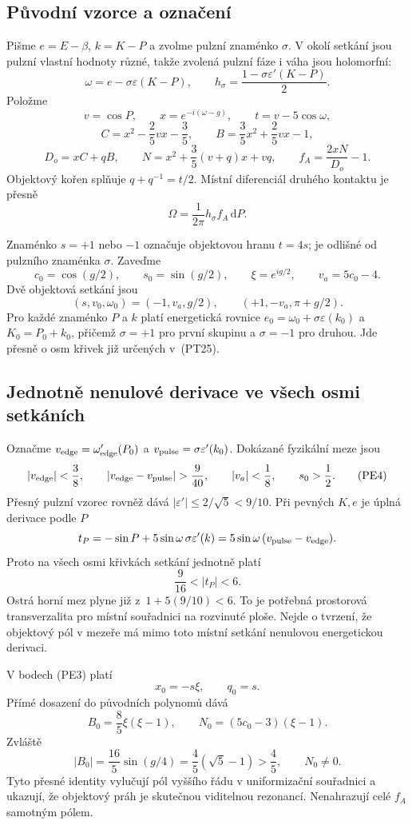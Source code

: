 \documentclass[11pt,a4paper]{article}
\theoremstyle{remark}\newtheorem{remark}[theorem]{Poznámka}
\numberwithin{equation}{section}
\begin{document}
\subsection{Původní vzorce a označení}

Pišme \(e=E-\beta\), \(k=K-P\) a zvolme pulzní znaménko
\(\sigma\). V okolí setkání jsou pulzní vlastní hodnoty různé,
takže zvolená pulzní fáze i váha jsou holomorfní:
\[
\omega=e-\sigma\varepsilon(K-P),\qquad
h_\sigma=\frac{1-\sigma\varepsilon'(K-P)}2.
\]
Položme
\[
v=\cos P,\qquad x=e^{-i(\omega-g)},\qquad t=v-5\cos\omega,
\]
\[
C=x^2-\frac25vx-\frac35,
\qquad B=\frac35x^2+\frac25vx-1,
\]
\[
D_o=xC+qB,\qquad
N=x^2+\frac35(v+q)x+vq,\qquad
f_A=\frac{2xN}{D_o}-1.
\tag{PE1}
\]
Objektový kořen splňuje \(q+q^{-1}=t/2\). Místní diferenciál
druhého kontaktu je přesně
\[
\Omega=\frac1{2\pi}h_\sigma f_A\,\mathrm dP.
\tag{PE2}
\]

Znaménko \(s=+1\) nebo \(-1\) označuje objektovou hranu
\(t=4s\); je odlišné od pulzního znaménka \(\sigma\). Zaveďme
\[
c_0=\cos(g/2),\qquad s_0=\sin(g/2),\qquad
\xi=e^{ig/2},\qquad v_a=5c_0-4.
\]
Dvě objektová setkání jsou
\[
(s,v_0,\omega_0)=(-1,v_a,g/2),
\qquad (+1,-v_a,\pi+g/2).
\tag{PE3}
\]
Pro každé znaménko \(P\) a \(k\) platí energetická rovnice
\(e_0=\omega_0+\sigma\varepsilon(k_0)\) a
\(K_0=P_0+k_0\), přičemž \(\sigma=+1\) pro první skupinu
a \(\sigma=-1\) pro druhou. Jde přesně o osm křivek již určených
v~(PT25).

\subsection{Jednotně nenulové derivace ve všech osmi setkáních}

Označme \(v_{\rm edge}=\omega_{\rm edge}'(P_0)\) a
\(v_{\rm pulse}=\sigma\varepsilon'(k_0)\). Dokázané fyzikální
meze jsou
\[
|v_{\rm edge}|<\frac38,\qquad
|v_{\rm edge}-v_{\rm pulse}|>\frac9{40},\qquad
|v_a|<\frac18,\qquad s_0>\frac12.
\tag{PE4}
\]
Přesný pulzní vzorec rovněž dává
\(|\varepsilon'|\le2/\sqrt5<9/10\). Při pevných \(K,e\)
je úplná derivace podle \(P\)
\[
t_P=-\sin P+5\sin\omega\,\sigma\varepsilon'(k)
=5\sin\omega\,(v_{\rm pulse}-v_{\rm edge}).
\]
Proto na všech osmi křivkách setkání jednotně platí
\[
\boxed{\frac9{16}<|t_P|<6.}
\tag{PE5}
\]
Ostrá horní mez plyne již z~\(1+5(9/10)<6\). To je potřebná
prostorová transverzalita pro místní souřadnici na rozvinuté ploše.
Nejde o tvrzení, že objektový pól v mezeře má mimo toto místní
setkání nenulovou energetickou derivaci.

V bodech (PE3) platí
\[
x_0=-s\xi,\qquad q_0=s.
\]
Přímé dosazení do původních polynomů dává
\[
\boxed{
B_0=\frac85\xi(\xi-1),\qquad
N_0=(5c_0-3)(\xi-1).
}
\tag{PE6}
\]
Zvláště
\[
|B_0|=\frac{16}{5}\sin(g/4)
=\frac45(\sqrt5-1)>\frac45,
\qquad N_0\ne0.
\tag{PE7}
\]
Tyto přesné identity vylučují pól vyššího řádu v uniformizační
souřadnici a ukazují, že objektový práh je skutečnou viditelnou
rezonancí. Nenahrazují celé \(f_A\) samotným pólem.
\end{document}
